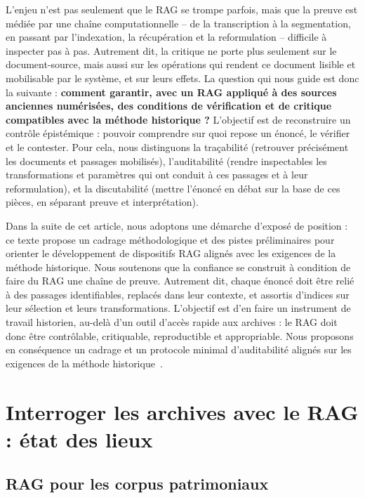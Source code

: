 \documentclass[final, fra]{anthology-ch}     %
\begin{document}
L’enjeu n’est pas seulement que le RAG se trompe parfois, mais que la preuve est médiée par une chaîne computationnelle -- de la transcription à la segmentation, en passant par l'indexation, la récupération et la reformulation -- difficile à inspecter pas à pas. Autrement dit, la critique ne porte plus seulement sur le document-source, mais aussi sur les opérations qui rendent ce document lisible et mobilisable par le système, et sur leurs effets. La question qui nous guide est donc la suivante : \textbf{comment garantir, avec un RAG appliqué à des sources anciennes numérisées, des conditions de vérification et de critique compatibles avec la méthode historique ?} L’objectif est de reconstruire un contrôle épistémique : pouvoir comprendre sur quoi repose un énoncé, le vérifier et le contester. Pour cela, nous distinguons la traçabilité (retrouver précisément les documents et passages mobilisés), l’auditabilité (rendre inspectables les transformations et paramètres qui ont conduit à ces passages et à leur reformulation), et la discutabilité (mettre l’énoncé en débat sur la base de ces pièces, en séparant preuve et interprétation). 

Dans la suite de cet article, nous adoptons une démarche d'exposé de position : ce texte propose un cadrage méthodologique et des pistes préliminaires pour orienter le développement de dispositifs RAG alignés avec les exigences de la méthode historique. 
Nous soutenons que la confiance se construit à condition de faire du RAG une chaîne de preuve. 
Autrement dit, chaque énoncé doit être relié à des passages identifiables, replacés dans leur contexte, et assortis d’indices sur leur sélection et leurs transformations. 
L’objectif est d’en faire un instrument de travail historien, au-delà d'un outil d’accès rapide aux archives : le RAG doit donc être contrôlable, critiquable, reproductible et appropriable. 
Nous proposons en conséquence un cadrage et un protocole minimal d’auditabilité alignés sur les exigences de la méthode historique~\cite{langlois1898introduction, bloch1949apologie, prost1996douze}.

\section{Interroger les archives avec le RAG : état des lieux}

\subsection{RAG pour les corpus patrimoniaux} \label{sec:rag_patrimoine}
\end{document}
